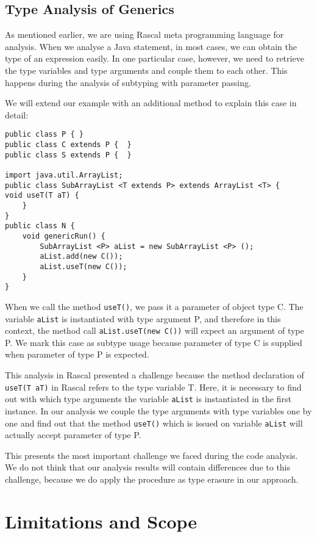 \documentclass{uvamscse}
\begin{document}
\subsection{Type Analysis of Generics}
As mentioned earlier, we are using Rascal meta programming language for analysis. When we analyse a Java statement, in most cases, we can obtain the type of an expression easily. In one particular case, however, we need to retrieve the type variables and type arguments and couple them to each other. This happens during the analysis of subtyping with parameter passing. 

We will extend our example with an additional method to explain this case in detail: 
\begin{verbatim}
public class P { }
public class C extends P {  }
public class S extends P {  }

import java.util.ArrayList;
public class SubArrayList <T extends P> extends ArrayList <T> { 
void useT(T aT) {	
	}
}
public class N {
    void genericRun() {
        SubArrayList <P> aList = new SubArrayList <P> ();
        aList.add(new C());
        aList.useT(new C());
    }
}
\end{verbatim}

When we call the method \texttt{useT()}, we pass it a parameter of object type C. The variable \texttt{aList} is instantiated with type argument P, and therefore in this context, the method call \texttt{aList.useT(new C())} will expect an argument of type P. We mark this case as subtype usage because parameter of type C is supplied when parameter of type P is expected.

This analysis in Rascal presented a challenge because the method declaration of \texttt{useT(T aT)} in Rascal refers to the type variable T. Here, it is necessary to find out with which type arguments the variable \texttt{aList} is instantiated in the first instance. In our analysis we couple the type arguments with type variables one by one and find out that the method \texttt{useT()} which is issued on variable \texttt{aList} will actually accept parameter of type P.

This presents the most important challenge we faced during the code analysis. We do not think that our analysis results will contain differences due to this challenge, because we do apply the procedure as type erasure in our approach.


\section{Limitations and Scope}
\end{document}
